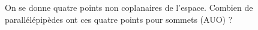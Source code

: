 On se donne quatre points non coplanaires de l'espace. Combien de parallélépipèdes ont ces quatre points pour sommets (AUO) ?

